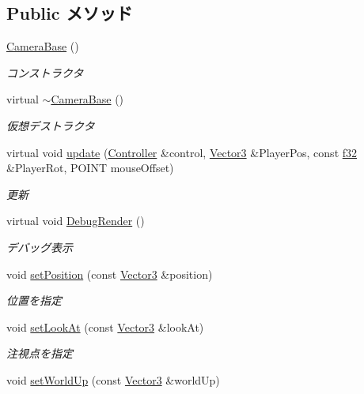 \subsection*{Public メソッド}
\begin{DoxyCompactItemize}
\item 
\hyperlink{class_camera_base_a7e0c8252a40bc63d8ba4b7f1aa6fadd4}{Camera\-Base} ()
\begin{DoxyCompactList}\small\item\em コンストラクタ \end{DoxyCompactList}\item 
virtual \hyperlink{class_camera_base_aab4dedae85ee16a8aeb397b6c109431f}{$\sim$\-Camera\-Base} ()
\begin{DoxyCompactList}\small\item\em 仮想デストラクタ \end{DoxyCompactList}\item 
virtual void \hyperlink{class_camera_base_a5d21e2335eaca87dd90cf0f8b16ad9ca}{update} (\hyperlink{class_controller}{Controller} \&control, \hyperlink{struct_vector3}{Vector3} \&Player\-Pos, const \hyperlink{_main_8h_a5f6906312a689f27d70e9d086649d3fd}{f32} \&Player\-Rot, P\-O\-I\-N\-T mouse\-Offset)
\begin{DoxyCompactList}\small\item\em 更新 \end{DoxyCompactList}\item 
virtual void \hyperlink{class_camera_base_a50b83449318c2f2b2e49d7275f8b52fa}{Debug\-Render} ()
\begin{DoxyCompactList}\small\item\em デバッグ表示 \end{DoxyCompactList}\item 
void \hyperlink{class_camera_base_acad18468f19f9fd8e7b8702f6c006560}{set\-Position} (const \hyperlink{struct_vector3}{Vector3} \&position)
\begin{DoxyCompactList}\small\item\em 位置を指定 \end{DoxyCompactList}\item 
void \hyperlink{class_camera_base_aa4f4be10303b61183236a2d5abf21e16}{set\-Look\-At} (const \hyperlink{struct_vector3}{Vector3} \&look\-At)
\begin{DoxyCompactList}\small\item\em 注視点を指定 \end{DoxyCompactList}\item 
void \hyperlink{class_camera_base_a0afcc44fd87f9e9e0894070073d2b3a1}{set\-World\-Up} (const \hyperlink{struct_vector3}{Vector3} \&world\-Up)

\end{DoxyCompactItemize}
